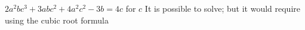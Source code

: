 {$2a^2bc^3+3abc^2+4a^2c^2-3b=4c$ for $c$}
{It is possible to solve; but it would require using the cubic root formula}
